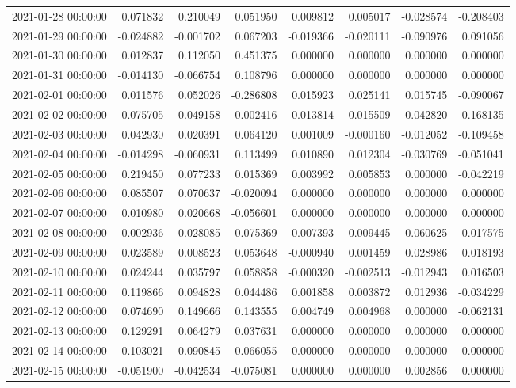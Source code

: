 \begin{tabular}{lrrrrrrr}
2021-01-28 00:00:00 & 0.071832 & 0.210049 & 0.051950 & 0.009812 & 0.005017 & -0.028574 & -0.208403 \\
2021-01-29 00:00:00 & -0.024882 & -0.001702 & 0.067203 & -0.019366 & -0.020111 & -0.090976 & 0.091056 \\
2021-01-30 00:00:00 & 0.012837 & 0.112050 & 0.451375 & 0.000000 & 0.000000 & 0.000000 & 0.000000 \\
2021-01-31 00:00:00 & -0.014130 & -0.066754 & 0.108796 & 0.000000 & 0.000000 & 0.000000 & 0.000000 \\
2021-02-01 00:00:00 & 0.011576 & 0.052026 & -0.286808 & 0.015923 & 0.025141 & 0.015745 & -0.090067 \\
2021-02-02 00:00:00 & 0.075705 & 0.049158 & 0.002416 & 0.013814 & 0.015509 & 0.042820 & -0.168135 \\
2021-02-03 00:00:00 & 0.042930 & 0.020391 & 0.064120 & 0.001009 & -0.000160 & -0.012052 & -0.109458 \\
2021-02-04 00:00:00 & -0.014298 & -0.060931 & 0.113499 & 0.010890 & 0.012304 & -0.030769 & -0.051041 \\
2021-02-05 00:00:00 & 0.219450 & 0.077233 & 0.015369 & 0.003992 & 0.005853 & 0.000000 & -0.042219 \\
2021-02-06 00:00:00 & 0.085507 & 0.070637 & -0.020094 & 0.000000 & 0.000000 & 0.000000 & 0.000000 \\
2021-02-07 00:00:00 & 0.010980 & 0.020668 & -0.056601 & 0.000000 & 0.000000 & 0.000000 & 0.000000 \\
2021-02-08 00:00:00 & 0.002936 & 0.028085 & 0.075369 & 0.007393 & 0.009445 & 0.060625 & 0.017575 \\
2021-02-09 00:00:00 & 0.023589 & 0.008523 & 0.053648 & -0.000940 & 0.001459 & 0.028986 & 0.018193 \\
2021-02-10 00:00:00 & 0.024244 & 0.035797 & 0.058858 & -0.000320 & -0.002513 & -0.012943 & 0.016503 \\
2021-02-11 00:00:00 & 0.119866 & 0.094828 & 0.044486 & 0.001858 & 0.003872 & 0.012936 & -0.034229 \\
2021-02-12 00:00:00 & 0.074690 & 0.149666 & 0.143555 & 0.004749 & 0.004968 & 0.000000 & -0.062131 \\
2021-02-13 00:00:00 & 0.129291 & 0.064279 & 0.037631 & 0.000000 & 0.000000 & 0.000000 & 0.000000 \\
2021-02-14 00:00:00 & -0.103021 & -0.090845 & -0.066055 & 0.000000 & 0.000000 & 0.000000 & 0.000000 \\
2021-02-15 00:00:00 & -0.051900 & -0.042534 & -0.075081 & 0.000000 & 0.000000 & 0.002856 & 0.000000 \\

\end{tabular}
